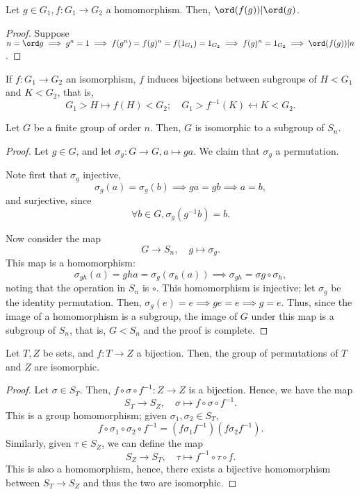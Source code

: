 \documentclass[12pt,oneside]{article}
\begin{document}
\begin{lemma}
  Let $g \in G_1, f : G_1 \to G_2$ a homomorphism. Then, $\ord (f(g)) | \ord (g)$.
\end{lemma}

\begin{proof}
  Suppose $n = \ord g \implies g^n = 1 \implies f(g^n) = f(g)^n = f(1_{G_1}) = 1_{G_2} \implies f(g)^n = 1_{G_2} \implies \ord (f(g)) | n$.
\end{proof}

\begin{corollary}
  If $f : G_1 \to G_2$ an isomorphism, $f$ induces bijections between subgroups of $H < G_1$ and $K < G_2$, that is, \[
  G_1> H \mapsto f(H) < G_2; \quad G_1 > f^{-1}(K) \mapsfrom K < G_2.
  \]
\end{corollary}

\begin{theorem}[Cayley]\label{thm:cayley}
  Let $G$ be a finite group of order $n$. Then, $G$ is isomorphic to a subgroup of $S_n$.
\end{theorem}

\begin{proof}
  Let $g \in G$, and let $\sigma_g : G \to G, a \mapsto ga$. We claim that $\sigma_g$ a permutation.

  Note first that $\sigma_g$ injective, \[
  \sigma_g(a) = \sigma_g(b) \implies ga = gb \implies a = b,  
  \]
  and surjective, since \[
  \forall b \in G, \sigma_g(g^{-1}b) = b.  
  \]
  
  Now consider the map \[
  G \to S_n, \quad g \mapsto \sigma_g.
  \]
  This map is a homomorphism:
  \[
  \sigma_{gh}(a) = gha = \sigma_g(\sigma_h(a)) \implies \sigma_{gh} = \sigma g\circ \sigma_h,
  \]
  noting that the operation in $S_n$ is $\circ$. This homomorphism is injective; let $\sigma_g$ be the identity permutation. Then, $\sigma_g(e) = e \implies ge = e \implies g = e$. Thus, since the image of a homomorphism is a subgroup, the image of $G$ under this map is a subgroup of $S_n$, that is, $G < S_n$ and the proof is complete.
\end{proof}

\begin{lemma}
  Let $T, Z$ be sets, and $f : T \to Z$ a bijection. Then, the group of permutations of $T$ and $Z$ are isomorphic.
\end{lemma}

\begin{proof}
  Let $\sigma \in S_T$. Then, $f \circ \sigma \circ f^{-1} : Z \to Z$ is a bijection. Hence, we have the map \[S_T \to S_Z, \quad \sigma \mapsto f\circ \sigma\circ f^{-1}.\]
  This is a group homomorphism; given $\sigma_1, \sigma_2 \in S_T$, $$f \circ \sigma_1 \circ \sigma_2 \circ f^{-1} = (f\sigma_1f^{-1})(f \sigma_2f^{-1}).$$ Similarly, given $\tau \in S_Z$, we can define the map \[S_Z \to S_T, \quad \tau \mapsto f^{-1} \circ \tau \circ f.\] This is also a homomorphism, hence, there exists a bijective homomorphism between $S_T \to S_Z$ and thus the two are isomorphic.
\end{proof}
\end{document}
